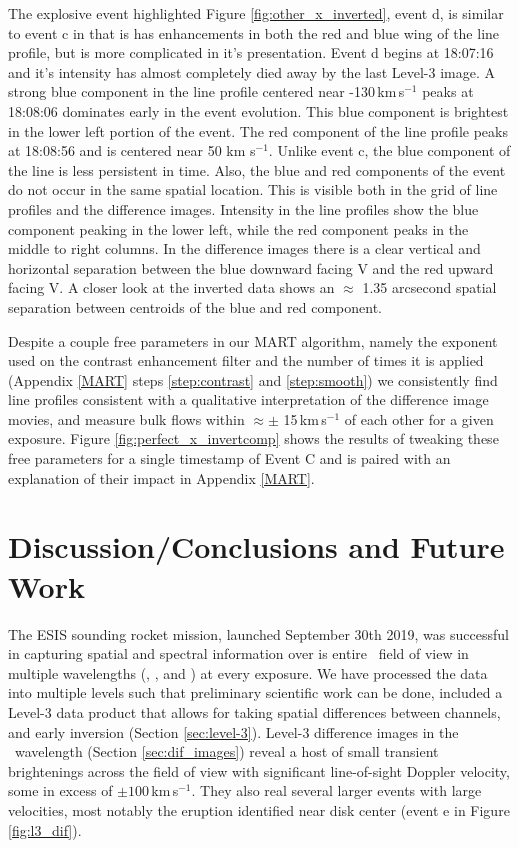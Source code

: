 		The explosive event highlighted Figure \ref{fig:other_x_inverted}, event d, is similar to event c in that is has enhancements in both the red and blue wing of the line profile, but is more complicated in it's presentation.
		Event d  begins at 18:07:16 and it's intensity has almost completely died away by the last Level-3 image.
		A strong blue component in the line profile centered near -130\,km\,s$^{-1}$  peaks at 18:08:06 dominates early in the event evolution.
		This blue component is brightest in the lower left portion of the event.
		The red component of the line profile peaks at 18:08:56 and is centered near 50 km s$^{-1}$.
		Unlike event c, the blue component of the line is less persistent in time.
		Also, the blue and red components of the event do not occur in the same spatial location.
		This is visible both in the grid of line profiles and the difference images.
		Intensity in the line profiles show the blue component peaking in the lower left, while the red component peaks in the middle to right columns.
		In the difference images there is a clear vertical and horizontal separation between the blue downward facing V and the red upward facing V. 
		A closer look at the inverted data shows an $\approx$ 1.35 arcsecond spatial separation between centroids of the blue and red component.

		Despite a couple free parameters in our MART algorithm, namely the exponent used on the contrast enhancement filter and the number of times it is applied (Appendix \ref{MART} steps \ref{step:contrast} and \ref{step:smooth}) we consistently find line profiles consistent with a qualitative interpretation of the difference image movies, and measure bulk flows within $\approx\pm$ 15\,km\,s$^{-1}$ of each other for a given exposure.
		Figure \ref{fig:perfect_x_invertcomp} shows the results of tweaking these free parameters for a single timestamp of Event C and is paired with an explanation of their impact in Appendix \ref{MART}.
	    		   	

    	
\section{Discussion/Conclusions and Future Work}
	The ESIS sounding rocket mission, launched September 30th 2019, was successful in capturing spatial and spectral information over is entire \esisfov \ field of view in multiple wavelengths (\hei, \mgxbright, and \ov) at every exposure.
	We have processed the data into multiple levels such that preliminary scientific work can be done, included a Level-3 data product that allows for taking spatial differences between channels, and early inversion (Section \ref{sec:level-3}).
	Level-3 difference images in the \ov \ wavelength (Section \ref{sec:dif_images}) reveal a host of small transient brightenings across the field of view with significant line-of-sight Doppler velocity, some in excess of $\pm 100\,$km\,s$^{-1}$.
	They also real several larger events with large velocities, most notably the eruption identified near disk center (event e in Figure \ref{fig:l3_dif}).
	
